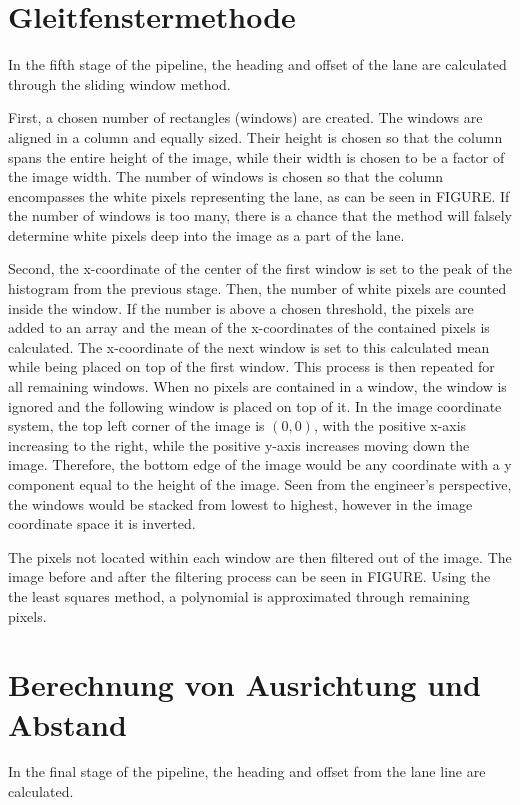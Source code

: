 \documentclass[arbeit=studie,oneside,BCOR=12mm]{ArbeitRST}
\begin{document}
\section{Gleitfenstermethode}


In the fifth stage of the pipeline, the heading and offset of the lane are
calculated through the sliding window method.

First, a chosen number of rectangles (windows) are created. The windows are
aligned in a column and equally sized. Their height is chosen so that the
column spans the entire height of the image, while their width is chosen to be
a factor of the image width. The number of windows is chosen so that the column
encompasses the white pixels representing the lane,
as can be seen in FIGURE. If the number of windows is too many, there is a
chance that the method will falsely determine white pixels deep into the image
as a part of the lane. 

Second, the x-coordinate of the center of the first window is set to the peak
of the histogram from the previous stage. Then, the number of white pixels are
counted inside the window. If the number is above a chosen threshold, the
pixels are added to an array and the mean of the x-coordinates of the contained
pixels is calculated. The x-coordinate of the next window is set to this
calculated mean while being placed on top of the first window. This process is
then repeated for all remaining windows. When no pixels are contained in a
window, the window is ignored and the following window is placed on top of it.
In the image coordinate system, the top left corner of the image is $(0, 0)$,
with the positive x-axis increasing to the right, while the positive y-axis
increases moving down the image. Therefore, the bottom edge of the image would
be any coordinate with a y component equal to the height of the image. Seen
from the engineer's perspective, the windows would be stacked from lowest to
highest, however in the image coordinate space it is inverted. 

The pixels not located within each window are then filtered out of the image.
The image before and after the filtering process can be seen in FIGURE. Using
the the least squares method, a polynomial is approximated through remaining
pixels.

\section{Berechnung von Ausrichtung und Abstand}
In the final stage of the pipeline, the heading and offset from the lane line
are calculated. 
\end{document}
